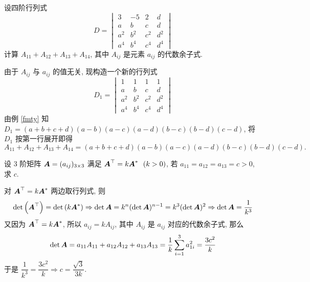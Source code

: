 \begin{example}[2010 云南大学]
    设四阶行列式
    $$D=\begin{vmatrix}
            3   & -5  & 2   & d   \\
            a   & b   & c   & d   \\
            a^2 & b^2 & c^2 & d^2 \\
            a^4 & b^4 & c^4 & d^4
        \end{vmatrix}$$
    计算 $A_{11}+A_{12}+A_{13}+A_{14}$, 其中 $A_{ij}$ 是元素 $a_{ij}$ 的代数余子式.
\end{example}
\begin{solution}
    由于 $A_{ij}$ 与 $a_{ij}$ 的值无关, 现构造一个新的行列式
    $$D_1=\begin{vmatrix}
            1   & 1   & 1   & 1   \\
            a   & b   & c   & d   \\
            a^2 & b^2 & c^2 & d^2 \\
            a^4 & b^4 & c^4 & d^4
        \end{vmatrix}$$
        由例 \ref{fmty} 知 $D_1=(a+b+c+d)(a-b)(a-c)(a-d)(b-c)(b-d)(c-d)$, 
        将 $D_1$ 按第一行展开即得 
        $$A_{11}+A_{12}+A_{13}+A_{14}=(a+b+c+d)(a-b)(a-c)(a-d)(b-c)(b-d)(c-d).$$
\end{solution}

\begin{example}
    设 3 阶矩阵 $\vb*{A}=(a_{ij})_{3\times 3}$ 满足 $\vb*{A}^\top=k\vb*{A}^*~~(k>0)$, 若 $a_{11}=a_{12}=a_{13}=c>0$, 求 $c.$
\end{example}
\begin{solution}
    对 $\vb*{A}^\top=k\vb*{A}^*$ 两边取行列式, 则 $$\det\qty(\vb*{A}^\top)=\det\qty(k\vb*{A}^*)\Rightarrow \det\vb*{A}=k^n(\det\vb*{A})^{n-1}=k^3(\det\vb*{A})^2\Rightarrow \det\vb*{A}=\dfrac{1}{k^3}$$
    又因为 $\vb*{A}^\top=k\vb*{A}^*$, 所以 $a_{ij}=kA_{ij}$, 其中 $A_{ij}$ 是 $a_{ij}$ 对应的代数余子式, 那么 $$\det\vb*{A}=a_{11}A_{11}+a_{12}A_{12}+a_{13}A_{13}=\dfrac{1}{k}\sum_{i=1}^{3}a_{1i}^2=\dfrac{3c^2}{k}$$
    于是 $\dfrac{1}{k^3}=\dfrac{3c^2}{k}\Rightarrow c=\dfrac{\sqrt{3}}{3k}.$
\end{solution}
